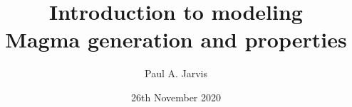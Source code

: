 \documentclass{beamer}
\title[Modeling volcanic processes]{Introduction to modeling \\ Magma generation and properties} %
\author[Paul Jarvis]{Paul A. Jarvis} %
\institute[UNIGE] %
{
\textit{paul.jarvis@unige.ch} %
}
\date{26th November 2020} %
\begin{document}
\begin{frame}
\titlepage %
\end{frame}





\end{document}
